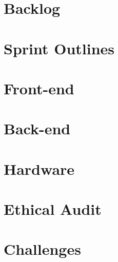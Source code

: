 \section{Backlog}


\section{Sprint Outlines}


\section{Front-end}


\section{Back-end}


\section{Hardware}


\section{Ethical Audit}


\section{Challenges}
